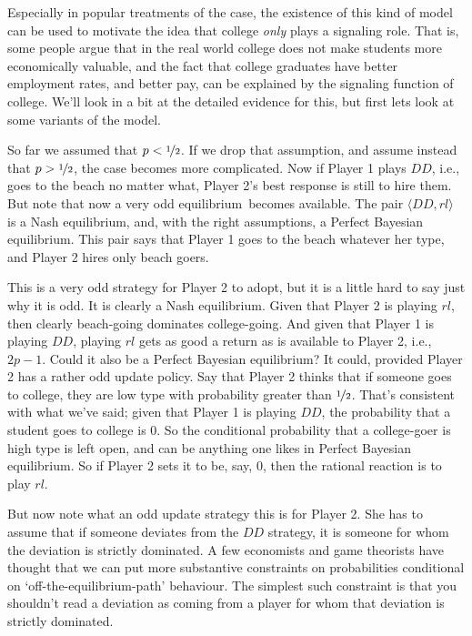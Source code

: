 \documentclass[
  11pt,
  letterpaper,
]{scrbook}
\begin{document}
Especially in popular treatments of the case, the existence of this kind
of model can be used to motivate the idea that college \emph{only} plays
a signaling role. That is, some people argue that in the real world
college does not make students more economically valuable, and the fact
that college graduates have better employment rates, and better pay, can
be explained by the signaling function of college. We'll look in a bit
at the detailed evidence for this, but first lets look at some variants
of the model.

So far we assumed that \(p < \nicefrac{1}{2}\). If we drop that
assumption, and assume instead that \(p > \nicefrac{1}{2}\), the case
becomes more complicated. Now if Player 1 plays \(DD\), i.e., goes to
the beach no matter what, Player 2's best response is still to hire
them. But note that now a very odd equilibrium~becomes available. The
pair \(\langle DD, rl \rangle\) is a Nash equilibrium, and, with the
right assumptions, a Perfect Bayesian equilibrium. This pair says that
Player 1 goes to the beach whatever her type, and Player 2 hires only
beach goers.

This is a very odd strategy for Player 2 to adopt, but it is a little
hard to say just why it is odd. It is clearly a Nash equilibrium. Given
that Player 2 is playing \(rl\), then clearly beach-going dominates
college-going. And given that Player 1 is playing \(DD\), playing \(rl\)
gets as good a return as is available to Player 2, i.e., \(2p-1\). Could
it also be a Perfect Bayesian equilibrium? It could, provided Player 2
has a rather odd update policy. Say that Player 2 thinks that if someone
goes to college, they are low type with probability greater than
\(\nicefrac{1}{2}\). That's consistent with what we've said; given that
Player 1 is playing \(DD\), the probability that a student goes to
college is 0. So the conditional probability that a college-goer is high
type is left open, and can be anything one likes in Perfect Bayesian
equilibrium. So if Player 2 sets it to be, say, 0, then the rational
reaction is to play \(rl\).

But now note what an odd update strategy this is for Player 2. She has
to assume that if someone deviates from the \(DD\) strategy, it is
someone for whom the deviation is strictly dominated. A few economists
and game theorists have thought that we can put more substantive
constraints on probabilities conditional on `off-the-equilibrium-path'
behaviour. The simplest such constraint is that you shouldn't read a
deviation as coming from a player for whom that deviation is strictly
dominated.
\end{document}
